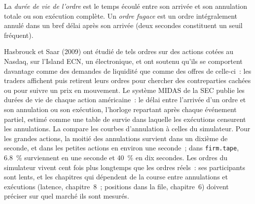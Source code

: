 \begin{definition}\label{def:mx:empirical-facts-of-order-books:life}
La \emph{durée de vie de l'ordre} est le temps écoulé entre son arrivée et son annulation totale ou son exécution complète. Un \emph{ordre
fugace} est un ordre intégralement annulé dans un bref délai après son arrivée (deux secondes constituent un seuil fréquent).
\end{definition}

Hasbrouck et Saar (2009) ont étudié de tels ordres sur des actions cotées au Nasdaq, sur l'Island ECN, un  électronique, et ont soutenu qu'ils se comportent davantage comme des demandes de liquidité que comme des offres
de celle-ci~: les traders affichent puis retirent leurs ordres pour chercher des contreparties cachées ou pour suivre un prix en mouvement. Le système MIDAS de la SEC publie les durées de vie de chaque
action américaine~: le délai entre l'arrivée d'un ordre et son annulation ou son exécution, l'horloge repartant après chaque événement partiel, estimé comme une table de survie
dans laquelle les exécutions censurent les annulations. La  compare les courbes d'annulation à celles du simulateur. Pour
les grandes actions, la moitié des annulations survient dans un dixième de seconde, et dans les petites actions en environ une seconde~; dans \texttt{firm.tape}, 6.8~\% surviennent en
une seconde et 40~\% en dix secondes. Les ordres du simulateur vivent cent fois plus longtemps que les ordres réels~: ses participants sont lents, et les chapitres qui dépendent de
la course entre annulations et exécutions (latence, chapitre~8~; positions dans la file, chapitre~6) doivent préciser sur quel marché ils sont mesurés.

